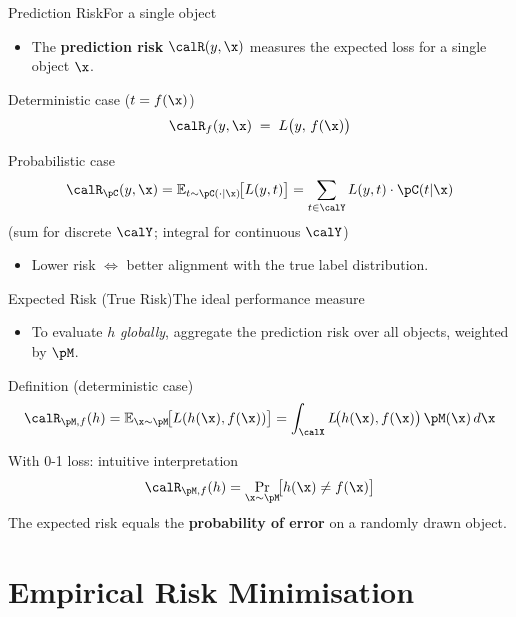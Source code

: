 \begin{frame}{Prediction Risk}{For a single object}
  \begin{itemize}
    \item The \textcolor{AccentBlue}{\textbf{prediction risk}} $\calR(y, \x)$ measures the
          expected loss for a single object $\x$.
  \end{itemize}
  \bigskip
  \begin{block}{Deterministic case ($t = f(\x)$)}
    \[
      \calR_f(y, \x) \;=\; L\bigl(y,\, f(\x)\bigr)
    \]
  \end{block}
  \medskip
  \begin{block}{Probabilistic case}
    \[
      \calR_{\pC}(y, \x)
        = \mathbb{E}_{t \sim \pC(\cdot|\x)}\!\bigl[L(y, t)\bigr]
        = \sum_{t \in \calY} L(y, t) \cdot \pC(t|\x)
    \]
    (sum for discrete $\calY$; integral for continuous $\calY$)
  \end{block}
  \begin{itemize}
    \item Lower risk $\Leftrightarrow$ better alignment with the true label distribution.
  \end{itemize}
\end{frame}

\begin{frame}{Expected Risk (True Risk)}{The ideal performance measure}
  \begin{itemize}
    \item To evaluate $h$ \emph{globally}, aggregate the prediction risk over all objects,
          weighted by $\pM$.
  \end{itemize}
  \begin{block}{Definition (deterministic case)}
    \[
      \calR_{\pM,f}(h)
        = \mathbb{E}_{\x \sim \pM}\!\bigl[L(h(\x), f(\x))\bigr]
        = \int_{\calX} L\!\bigl(h(\x), f(\x)\bigr)\, \pM(\x)\, d\x
    \]
  \end{block}
  \begin{block}{With 0-1 loss: intuitive interpretation}
    \[
      \calR_{\pM,f}(h)
        = \Pr_{\x \sim \pM}\!\bigl[h(\x) \neq f(\x)\bigr]
    \]
    The expected risk equals the \textcolor{AccentBlue}{\textbf{probability of error}} on a
    randomly drawn object.
  \end{block}
\end{frame}

\section{Empirical Risk Minimisation}

